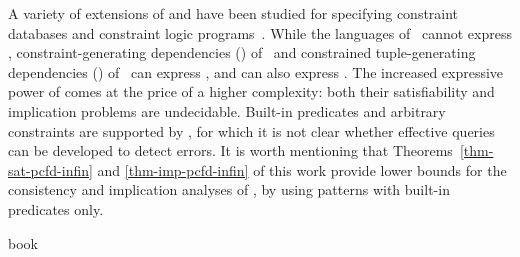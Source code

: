 A variety of extensions of \FDs and \INDs have been studied for
specifying constraint databases and constraint logic
programs~\cite{BCW99,BP83,Maher97,MS96}. While the languages
of~\cite{BCW99,Maher97} cannot express \CFDs,
constraint-generating dependencies (\CGDs)
of~\cite{BCW99} and constrained tuple-generating dependencies
(\CTGDs) of~\cite{MS96} can express \pCFDs,
and \CTGDs can also express \pCINDs. The increased expressive
power of \CTGDs comes at the price of a higher complexity:
both their satisfiability and implication problems are undecidable.
Built-in predicates and arbitrary constraints are supported
by \CGDs, for which it is not clear whether effective \SQL
queries can be developed to detect errors. It is worth mentioning
that Theorems~\ref{thm-sat-pcfd-infin} and \ref{thm-imp-pcfd-infin}
of this work provide lower bounds for the consistency and implication analyses
of \CGDs, by using patterns with built-in predicates only.

\cite{FanGJLM11-md,FanLMTY12-vldbj,FanLMTY-interaction,FanLTY12}

book~\cite{book-Fan}
